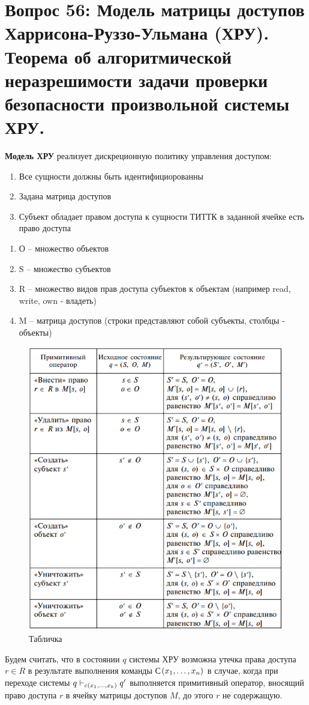 \section{Вопрос 56: Модель матрицы доступов Харрисона-Руззо-Ульмана (ХРУ). Теорема об алгоритмической неразрешимости задачи проверки безопасности произвольной системы ХРУ.}

\textbf{Модель ХРУ} реализует дискреционную политику управления доступом:
\begin{enumerate}
	\item Все сущности должны быть идентифициорованны
	\item Задана матрица доступов
	\item Субъект обладает правом доступа к сущности ТИТТК в заданной ячейке есть право доступа
\end{enumerate}

\begin{defs}
	\begin{enumerate}
		\item О -- множество объектов
		\item S -- множество субъектов
		\item R -- множество видов прав доступа субъектов к объектам (например read, write, own - владеть)
		\item M -- матрица доступов (строки представляют собой субъекты, столбцы - объекты)
	\end{enumerate}
\end{defs}

\begin{figure}[H]
	\centering
	\includegraphics[width=0.5\linewidth]{img/1.png}
	\caption{Табличка}
\end{figure}

\begin{defs}
	Будем считать, что в состоянии $q$ системы ХРУ возможна утечка права доступа $r \in R$ в результате выполнения команды С$\left(x_1,\ldots,x_n\right)$ в случае,
	когда при переходе системы $q \vdash_{c(x_1, \ldots, x_k)} q^{\prime}$ выполняется примитивный оператор, вносящий право доступа $r$ в ячейку матрицы доступов $M$, до этого $r$
	не содержащую.
\end{defs}

